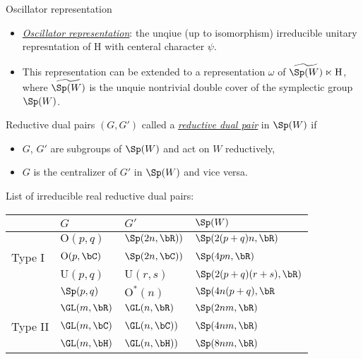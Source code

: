 \documentclass[final,hyperref={pdfpagelabels=false}]{beamer} %
\def\emph#1{{\em \underline{#1}}}
\begin{document}
\begin{frame}
\begin{columns}[t]
\begin{column}{.48\linewidth}
\begin{block}{Oscillator representation}
\begin{itemize}
        \item \emph{Oscillator representation}: the unqiue (up to isomorphism) irreducible unitary represntation of $\mathrm{H}$ with centeral character $\psi$.
        \item This representation can be extended to a representation $\omega$ of 
          $\widetilde{\Sp(W)}\ltimes \mathrm{H}$, where
          $\widetilde{\Sp(W)}$ is  the unquie nontrivial double cover of the symplectic group $\Sp(W)$.
        \end{itemize}
      \end{block}
      \vfill
      \begin{block}{Reductive dual pairs}
        $(G,G')$ called a \emph{reductive dual pair} in $\Sp(W)$ if
        \begin{itemize}
        \item $G$, $G'$  are subgroups of $\Sp(W)$ and act on $W$ reductively,
        \item $G$ is the centralizer of $G'$ in $\Sp(W)$ and vice versa. 
        \end{itemize}
        List of irreducible real reductive dual pairs:
       \begin{center}\small
        \begin{tabular}{ l |lll }
           & $G$ & $G'$ & $\Sp(W)$\\
          \hline
           & $\mathrm{O}(p,q)$ & $\Sp(2n,\bR))$ &$\Sp(2(p+q)n,\bR)$\\
           Type I & $\mathrm{O}(p,\bC)$ & $\Sp(2n,\bC))$ &$\Sp(4pn,\bR)$\\
          & $\mathrm{U}(p,q)$ & $\mathrm{U}(r,s)$ & $\Sp(2(p+q)(r+s),\bR)$\\ 
          & $\Sp(p,q)$& $\mathrm{O}^*(n)$ & $\Sp(4n(p+q),\bR$\\
          \hline
          &$\GL(m,\bR)$ & $\GL(n,\bR)$& $\Sp(2nm,\bR)$\\
         Type II &$\GL(m,\bC)$& $\GL(n,\bC))$& $\Sp(4nm,\bR)$ \\
          &$\GL(m,\bH)$& $\GL(n,\bH))$& $\Sp(8nm,\bR)$
        \end{tabular}
      \end{center}
    \end{block}


\end{column}
\end{columns}
\end{frame}
\end{document}
